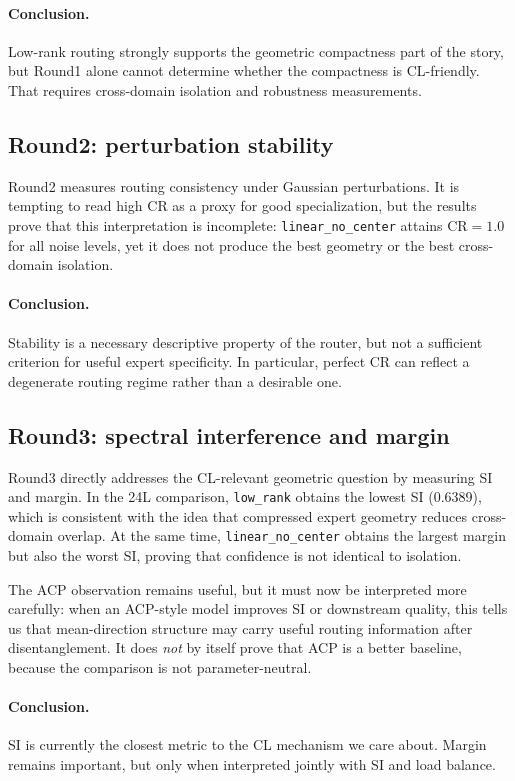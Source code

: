 \documentclass[11pt]{article}
\begin{document}
\paragraph{Conclusion.} Low-rank routing strongly supports the geometric compactness part of the story, but Round1 alone cannot determine whether the compactness is CL-friendly. That requires cross-domain isolation and robustness measurements.

\subsection{Round2: perturbation stability}
Round2 measures routing consistency under Gaussian perturbations. It is tempting to read high CR as a proxy for good specialization, but the results prove that this interpretation is incomplete: \texttt{linear\_no\_center} attains CR$=1.0$ for all noise levels, yet it does not produce the best geometry or the best cross-domain isolation.

\paragraph{Conclusion.} Stability is a necessary descriptive property of the router, but not a sufficient criterion for useful expert specificity. In particular, perfect CR can reflect a degenerate routing regime rather than a desirable one.

\subsection{Round3: spectral interference and margin}
Round3 directly addresses the CL-relevant geometric question by measuring SI and margin. In the 24L comparison, \texttt{low\_rank} obtains the lowest SI (0.6389), which is consistent with the idea that compressed expert geometry reduces cross-domain overlap. At the same time, \texttt{linear\_no\_center} obtains the largest margin but also the worst SI, proving that confidence is not identical to isolation.

The ACP observation remains useful, but it must now be interpreted more carefully: when an ACP-style model improves SI or downstream quality, this tells us that mean-direction structure may carry useful routing information after disentanglement. It does \emph{not} by itself prove that ACP is a better baseline, because the comparison is not parameter-neutral.

\paragraph{Conclusion.} SI is currently the closest metric to the CL mechanism we care about. Margin remains important, but only when interpreted jointly with SI and load balance.
\end{document}
